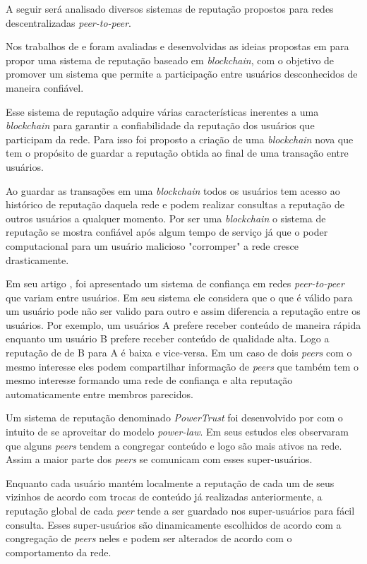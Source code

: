 \documentclass[12pt]{article}
\newcommand{\PtoP} {\emph{peer-to-peer}\xspace}
\begin{document}
A seguir será analisado diversos sistemas de reputação propostos para redes descentralizadas \PtoP.

Nos trabalhos de  \cite{dennis2015rep} e \cite{dennis2016rep} foram avaliadas e desenvolvidas as ideias propostas em \cite{nakamoto2008peer} para propor uma sistema de reputação baseado em \emph{blockchain}, com o objetivo de promover um sistema que permite a participação entre usuários desconhecidos de maneira confiável. 

Esse sistema de reputação adquire várias características inerentes a uma \emph{blockchain} para garantir a confiabilidade da reputação dos usuários que participam da rede. Para isso foi proposto a criação de uma \emph{blockchain} nova que tem o propósito de guardar a reputação obtida ao final de uma transação entre usuários.

Ao guardar as transações em uma \emph{blockchain} todos os usuários tem acesso ao histórico de reputação daquela rede e podem realizar consultas a reputação de outros usuários a qualquer momento. Por ser uma \emph{blockchain} o sistema de reputação se mostra confiável após algum tempo de serviço já que o poder computacional para um usuário malicioso "corromper" a rede cresce drasticamente.

Em seu artigo \cite{1231515}, foi apresentado um sistema de confiança em redes \PtoP que variam entre usuários. Em seu sistema ele considera que o que é válido para um usuário pode não ser valido para outro e assim diferencia a reputação entre os usuários. Por exemplo, um usuários A prefere receber conteúdo de maneira rápida enquanto um usuário B prefere receber conteúdo de qualidade alta. Logo a reputação de de B para A é baixa e vice-versa. Em um caso de dois \emph{peers} com o mesmo interesse eles podem compartilhar informação de \emph{peers} que também tem o mesmo interesse formando uma rede de confiança e alta reputação automaticamente entre membros parecidos.

Um sistema de reputação denominado \emph{PowerTrust} foi desenvolvido por \cite{zhou2007powertrust} com o intuito de se aproveitar do modelo \emph{power-law}. Em seus estudos eles observaram que alguns \emph{peers} tendem a congregar conteúdo e logo são mais ativos na rede. Assim a maior parte dos \emph{peers} se comunicam com esses super-usuários. 

Enquanto cada usuário mantém localmente a reputação de cada um de seus vizinhos de acordo com trocas de conteúdo já realizadas anteriormente, a reputação global de cada \emph{peer} tende a ser guardado nos super-usuários para fácil consulta. Esses super-usuários são dinamicamente escolhidos de acordo com a congregação de \emph{peers} neles e podem ser alterados de acordo com o comportamento da rede.
\end{document}
